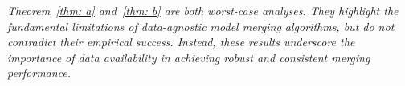 \begin{remark}
\textit{Theorem~\ref{thm: a} and~\ref{thm: b} are both worst-case analyses. They highlight the fundamental limitations of data-agnostic model merging algorithms, but do not contradict their empirical success.
Instead, these results underscore the importance of data availability in achieving robust and consistent merging performance.}
\end{remark}